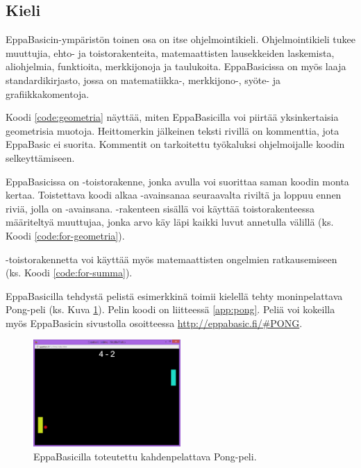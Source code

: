 \subsection{Kieli}
EppaBasicin-ympäristön toinen osa on
itse ohjelmointikieli.
Ohjelmointikieli tukee
muuttujia,
ehto- ja toistorakenteita,
matemaattisten lausekkeiden laskemista,
aliohjelmia, funktioita,
merkkijonoja ja
taulukoita.
EppaBasicissa on myös
laaja standardikirjasto,
jossa on matematiikka-,
merkkijono-, syöte- ja
grafiikkakomentoja.

Koodi \ref{code:geometria} näyttää,
miten EppaBasicilla voi piirtää
yksinkertaisia geometrisia muotoja.
Heittomerkin  jälkeinen
teksti rivillä on kommenttia,
jota EppaBasic ei suorita.
Kommentit on tarkoitettu
työkaluksi ohjelmoijalle
koodin selkeyttämiseen.


EppaBasicissa on
-toistorakenne, jonka
avulla voi suorittaa saman
koodin monta kertaa.
Toistettava koodi alkaa
-avainsanaa seuraavalta
riviltä ja loppuu ennen riviä,
jolla on -avainsana.
-rakenteen sisällä voi
käyttää toistorakenteessa määriteltyä
muuttujaa, jonka arvo käy läpi
kaikki luvut annetulla välillä
(ks. Koodi \ref{code:for-geometria}).


-toistorakennetta voi
käyttää myös matemaattisten 
ongelmien ratkausemiseen
(ks. Koodi \ref{code:for-summa}).


EppaBasicilla tehdystä pelistä
esimerkkinä toimii
kielellä tehty moninpelattava
Pong-peli
(ks. Kuva \ref{img:pong}).
Pelin koodi on liitteessä \ref{app:pong}.
Peliä voi kokeilla myös
EppaBasicin sivustolla osoitteessa
\url{http://eppabasic.fi/#PONG}.

\begin{figure}[h]
    \centering
    \includegraphics[width=0.5\textwidth]{pong}
    \caption{EppaBasicilla toteutettu kahdenpelattava Pong-peli.}
    \label{img:pong}
\end{figure}